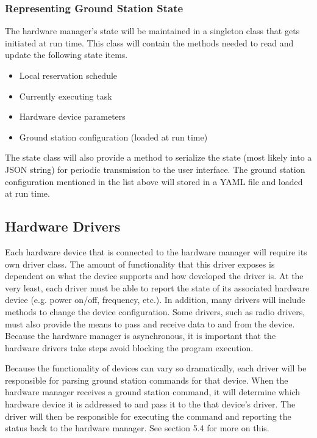 \documentclass{mxl-design}
\begin{document}
\subsubsection{Representing Ground Station State}
The hardware manager's state will be maintained in a singleton class that gets initiated at run time. This class will contain the methods needed to read and update the following state items.

\begin{itemize}
	\item Local reservation schedule
	\item Currently executing task
	\item Hardware device parameters
	\item Ground station configuration (loaded at run time)
\end{itemize}

The state class will also provide a method to serialize the state (most likely into a JSON string) for periodic transmission to the user interface. The ground station configuration mentioned in the list above will stored in a YAML file and loaded at run time.

\subsection{Hardware Drivers}
Each hardware device that is connected to the hardware manager will require its own driver class. The amount of functionality that this driver exposes is dependent on what the device supports and how developed the driver is. At the very least, each driver must be able to report the state of its associated hardware device (e.g. power on/off, frequency, etc.). In addition, many drivers will include methods to change the device configuration. Some drivers, such as radio drivers, must also provide the means to pass and receive data to and from the device. Because the hardware manager is asynchronous, it is important that the hardware drivers take steps avoid blocking the program execution.

Because the functionality of devices can vary so dramatically, each driver will be responsible for parsing ground station commands for that device. When the hardware manager receives a ground station command, it will determine which hardware device it is addressed to and pass it to the that device's driver. The driver will then be responsible for executing the command and reporting the status back to the hardware manager. See section 5.4 for more on this.
\end{document}
